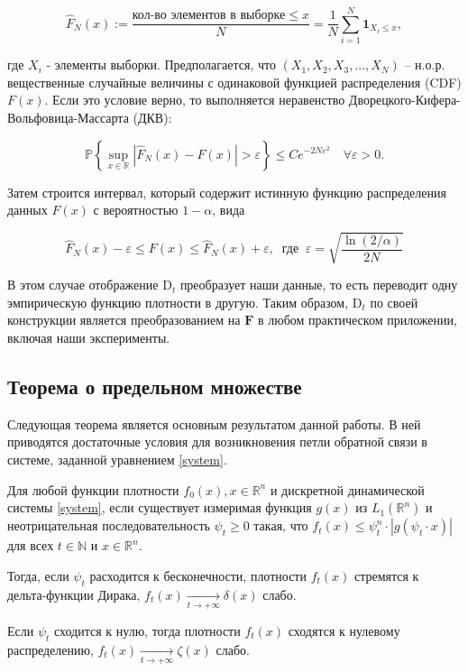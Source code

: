         \begin{equation*}
            \hat{F}_N(x) := \frac{\text{кол-во элементов в выборке} \leq x}{N} = \dfrac{1}{N}\sum\limits_{i=1}^N \textbf{1}_{X_i \leq x},
        \end{equation*}

        где $X_i$ - элементы выборки. Предполагается, что $(X_1, X_2, X_3, ... , X_N)$ -- н.о.р. вещественные случайные величины с одинаковой функцией распределения (CDF) $F(x)$. Если это условие верно, то выполняется неравенство Дворецкого-Кифера-Вольфовица-Массарта (ДКВ):

        \begin{equation*}\label{DKW}
            \mathbb{P}\left\{\underset{x \in \mathbb{R}}{\sup}\left|\hat{F}_N(x) - F(x)\right| > \varepsilon \right\} \leq C e^{-2N\varepsilon^2} \quad 
            \forall \varepsilon > 0.
        \end{equation*}

        Затем строится интервал, который содержит истинную функцию распределения данных $F(x)$ с вероятностью $1 - \alpha$, вида

        \begin{equation*}
            \hat{F}_N(x) - \varepsilon \leq F(x) \leq \hat{F}_N(x) + \varepsilon, ~ \text{ где } ~ \varepsilon = \sqrt{\frac{\ln(2/\alpha)}{2N}}
        \end{equation*}

        В этом случае отображение $\text{D}_t$ преобразует наши данные, то есть переводит одну эмпирическую функцию плотности в другую. Таким образом, $\text{D}_t$ по своей конструкции является преобразованием на $\textbf{F}$ в любом практическом приложении, включая наши эксперименты.

    \subsection{Теорема о предельном множестве}

        Следующая теорема является основным результатом данной работы. В ней приводятся достаточные условия для возникновения петли обратной связи в системе, заданной уравнением \eqref{system}.

        \begin{theorem}[Веприков, 2023] \label{delta}
        Для любой функции плотности $f_0(x), x \in \mathbb{R}^n$ и дискретной динамической системы \eqref{system}, если существует измеримая функция $g(x)$ из $L_1\left(\mathbb{R}^n\right)$ и неотрицательная последовательность $\psi_t \geq 0$ такая, что $f_t\left(x\right) \leq \psi_t^n \cdot |g(\psi_t \cdot x)|$ для всех $t \in \mathbb{N}$ и $x \in \mathbb{R}^n$.

        Тогда, если $\psi_t$ расходится к бесконечности, плотности $f_t(x)$ стремятся к дельта-функции Дирака, $f_t(x) \underset{t \to +\infty}{\longrightarrow} \delta(x)$ слабо.  

        Если $\psi_t$ сходится к нулю, тогда плотности $f_t(x)$ сходятся к нулевому распределению, $f_t(x) \underset{t \to +\infty}{\longrightarrow} \zeta(x)$ слабо.
    \end{theorem}

